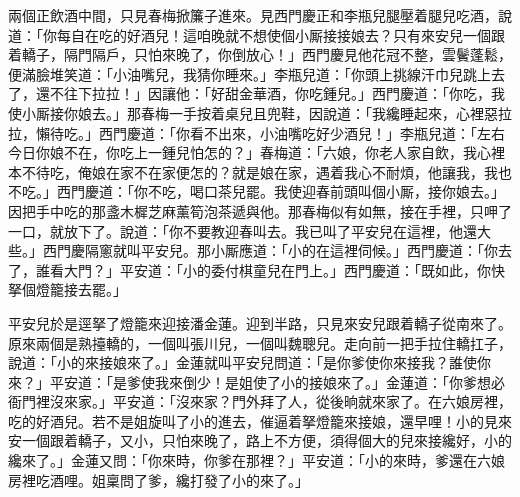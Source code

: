 兩個正飲酒中間，只見春梅掀簾子進來。見西門慶正和李瓶兒腿壓着腿兒吃酒，說道：「你每自在吃的好酒兒！這咱晚就不想使個小厮接接娘去？只有來安兒一個跟着轎子，隔門隔戶，只怕來晚了，你倒放心！」{}西門慶見他花冠不整，雲鬢蓬鬆，便滿臉堆笑道：「小油嘴兒，我猜你睡來。」李瓶兒道：「你頭上挑線汗巾兒跳上去了，還不往下拉拉！」因讓他：「好甜金華酒，你吃鍾兒。」西門慶道：「你吃，我使小厮接你娘去。」那春梅一手按着桌兒且兜鞋，因說道：「我纔睡起來，心裡惡拉拉，懶待吃。」西門慶道：「你看不出來，小油嘴吃好少酒兒！」李瓶兒道：「左右今日你娘不在，你吃上一鍾兒怕怎的？」春梅道：「六娘，你老人家自飲，我心裡本不待吃，俺娘在家不在家便怎的？就是娘在家，遇着我心不耐煩，他讓我，我也不吃。」西門慶道：「你不吃，喝口茶兒罷。我使迎春前頭叫個小厮，接你娘去。」因把手中吃的那盞木樨芝麻薰筍泡茶遞與他。那春梅似有如無，接在手裡，只呷了一口，就放下了。說道：「你不要教迎春叫去。我已叫了平安兒在這裡，他還大些。」西門慶隔窻就叫平安兒。那小厮應道：「小的在這裡伺候。」西門慶道：「你去了，誰看大門？」平安道：「小的委付棋童兒在門上。」西門慶道：「既如此，你快拏個燈籠接去罷。」

平安兒於是逕拏了燈籠來迎接潘金蓮。迎到半路，只見來安兒跟着轎子從南來了。原來兩個是熟擡轎的，一個叫張川兒，一個叫魏聰兒。走向前一把手拉住轎扛子，說道：「小的來接娘來了。」金蓮就叫平安兒問道：「是你爹使你來接我？誰使你來？」平安道：「是爹使我來倒少！是姐使了小的接娘來了。」金蓮道：「你爹想必衙門裡沒來家。」{}平安道：「沒來家？門外拜了人，從後晌就來家了。在六娘房裡，吃的好酒兒。若不是姐旋叫了小的進去，催逼着拏燈籠來接娘，還早哩！小的見來安一個跟着轎子，又小，只怕來晚了，路上不方便，須得個大的兒來接纔好，小的纔來了。」金蓮又問：「你來時，你爹在那裡？」平安道：「小的來時，爹還在六娘房裡吃酒哩。姐稟問了爹，纔打發了小的來了。」

